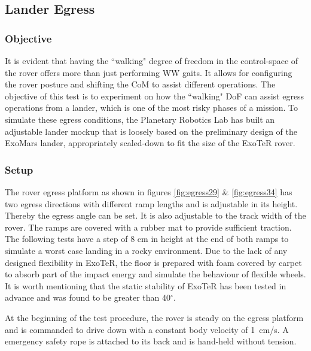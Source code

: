 \documentclass[a4paper,twocolumn]{esapub2005} %
\begin{document}

\subsection{Lander Egress} 

\subsubsection{Objective}
It is evident that having the ``walking" degree of freedom in the control-space
of the rover offers more than just performing WW gaits. It allows for
configuring the rover posture and shifting the CoM to assist different
operations. The objective of this test is to experiment on how the ``walking"
DoF can assist egress operations from a lander, which is one of the most risky
phases of a mission. To simulate these egress conditions, the Planetary
Robotics Lab has built an adjustable lander mockup that is loosely based on
the preliminary design of the ExoMars lander, appropriately scaled-down to fit
the size of the ExoTeR rover. 

\subsubsection{Setup}
The rover egress platform as shown in figures \ref{fig:egress29} \&
\ref{fig:egress34} has two egress directions with different ramp lengths and is
adjustable in its height. Thereby the egress angle can be set. It is also
adjustable to the track width of the rover. The ramps are covered with a rubber
mat to provide sufficient traction. The following tests have a step of 8 cm in
height at the end of both ramps to simulate a worst case landing in a rocky
environment.  Due to the lack of any designed flexibility in ExoTeR, the floor
is prepared with foam covered by carpet to absorb part of the impact energy and
simulate the behaviour of flexible wheels. It is worth mentioning that the
static stability of ExoTeR has been tested in advance and was found to be greater than
40$^\circ$.

At the beginning of the test procedure, the rover is steady on the egress
platform and is commanded to drive down with a constant body velocity of
1~\unit{cm/s}. A emergency safety rope is attached to its back and is hand-held
without tension. 
\end{document}

